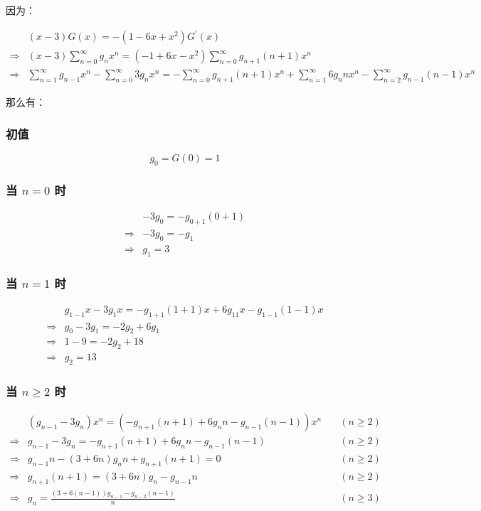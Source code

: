 \documentclass[UTF8]{article}
\begin{document}
因为：

$$
\begin{aligned}
    &(x-3)G(x)=-(1-6x+x^2)G ^\prime (x) \\
    \Rightarrow &(x-3)\sum_{n=0}^{\infty}g_nx^n=(-1+6x-x^2)\sum_{n=0}^{\infty}g_{n+1}(n+1)x^n \\
    \Rightarrow &\sum_{n=1}^{\infty}g_{n-1}x^n-\sum_{n=0}^{\infty}3g_nx^n=-\sum_{n=0}^{\infty}g_{n+1}(n+1)x^n+\sum_{n=1}^{\infty}6g_{n}nx^n-\sum_{n=2}^{\infty}g_{n-1}(n-1)x^n
\end{aligned}
$$

那么有：

\subsubsection{初值}

$$
g_0=G(0)=1
$$

\subsubsection{当 $n=0$ 时}

$$
\begin{aligned}
    &-3g_0=-g_{0+1}(0+1) \\
    \Rightarrow & -3g_0=-g_1 \\
    \Rightarrow & g_1=3
\end{aligned}
$$

\subsubsection{当 $n=1$ 时}

$$
\begin{aligned}
    &g_{1-1}x-3g_1x =-g_{1+1}(1+1)x+6g_11x-g_{1-1}(1-1)x\\
    \Rightarrow & g_0-3g_1=-2g_2+6g_1 \\
    \Rightarrow & 1-9=-2g_2+18 \\
    \Rightarrow & g_2=13
\end{aligned}
$$

\subsubsection{当 $n \ge 2$ 时}

$$
\begin{aligned}
    & \left(g_{n-1}-3g_n\right)x^n=\left(-g_{n+1}(n+1)+6g_nn-g_{n-1}(n-1) \right)x^n & \quad (n \ge 2) \\
    \Rightarrow &g_{n-1}-3g_n=-g_{n+1}(n+1)+6g_nn-g_{n-1}(n-1) & \quad (n \ge 2) \\
    \Rightarrow &g_{n-1}n-(3+6n)g_nn+g_{n+1}(n+1)=0 & \quad (n \ge 2) \\
    \Rightarrow &g_{n+1}(n+1)=(3+6n)g_{n}-g_{n-1}n & \quad (n \ge 2) \\
    \Rightarrow &g_{n}=\frac{(3+6(n-1))g_{n-1}-g_{n-2}(n-1)}{n} & \quad (n \ge 3)
\end{aligned}
$$
\end{document}
